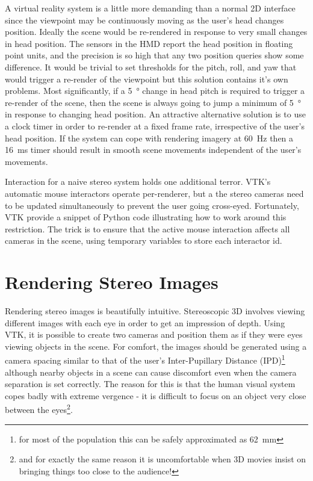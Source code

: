 \documentclass[MSc,paper=a4,pagesize=auto]{icldt}
\begin{document}
A virtual reality system is a little more demanding than a normal 2D interface since the viewpoint may be continuously moving as the user's head changes position. Ideally the scene would be re-rendered in response to very small changes in head position. The sensors in the HMD report the head position in floating point units, and the precision is so high that any two position queries show some difference. It would be trivial to set thresholds for the pitch, roll, and yaw that would trigger a re-render of the viewpoint but this solution contains it's own problems. Most significantly, if a \SI{5}{\degree} change in head pitch is required to trigger a re-render of the scene, then the scene is always going to jump a minimum of \SI{5}{\degree} in response to changing head position. An attractive alternative solution is to use a clock timer in order to re-render at a fixed frame rate, irrespective of the user's head position. If the system can cope with rendering imagery at \SI{60}{\Hz} then a \SI{16}{\ms} timer should result in smooth scene movements independent of the user's movements.

Interaction for a naive stereo system holds one additional terror. VTK's automatic mouse interactors operate per-renderer, but a the stereo cameras need to be updated simultaneously to prevent the user going cross-eyed. Fortunately, VTK provide a snippet of Python code illustrating how to work around this restriction. The trick is to ensure that the active mouse interaction affects all cameras in the scene, using temporary variables to store each interactor id. 

\section{Rendering Stereo Images}
Rendering stereo images is beautifully intuitive. Stereoscopic 3D involves viewing different images with each eye in order to get an impression of depth. Using VTK, it is possible to create two cameras and position them as if they were eyes viewing objects in the scene. For comfort, the images should be generated using a camera spacing similar to that of the user's Inter-Pupillary Distance (IPD)\footnote{for most of the population this can be safely approximated as \SI{62}{\mm}} although nearby objects in a scene can cause discomfort even when the camera separation is set correctly. The reason for this is that the human visual system copes badly with extreme vergence - it is difficult to focus on an object very close between the eyes\footnote{and for exactly the same reason it is uncomfortable when 3D movies insist on bringing things too close to the audience!}. 
\end{document}
